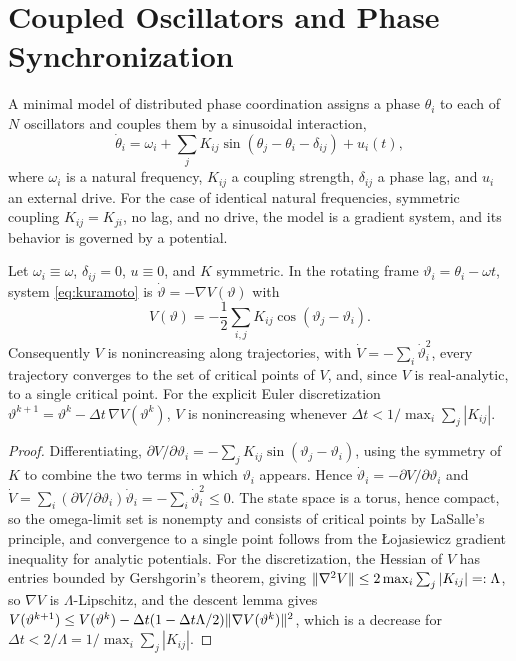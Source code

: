 \chapter{Coupled Oscillators and Phase Synchronization}\label{ch:kuramoto}

A minimal model of distributed phase coordination assigns a phase $\theta_i$ to each of $N$ oscillators and couples them by a sinusoidal interaction,
\begin{equation}\label{eq:kuramoto}
\dot\theta_i=\omega_i+\sum_jK_{ij}\sin(\theta_j-\theta_i-\delta_{ij})+u_i(t),
\end{equation}
where $\omega_i$ is a natural frequency, $K_{ij}$ a coupling strength, $\delta_{ij}$ a phase lag, and $u_i$ an external drive. For the case of identical natural frequencies, symmetric coupling $K_{ij}=K_{ji}$, no lag, and no drive, the model is a gradient system, and its behavior is governed by a potential.

\begin{theorem}\label{thm:kuramoto-grad}
Let $\omega_i\equiv\omega$, $\delta_{ij}=0$, $u\equiv0$, and $K$ symmetric. In the rotating frame $\vartheta_i=\theta_i-\omega t$, system \eqref{eq:kuramoto} is $\dot\vartheta=-\nabla V(\vartheta)$ with
\begin{equation}\label{eq:V}
V(\vartheta)=-\frac12\sum_{i,j}K_{ij}\cos(\vartheta_j-\vartheta_i).
\end{equation}
Consequently $V$ is nonincreasing along trajectories, with $\dot V=-\sum_i\dot\vartheta_i^2$, every trajectory converges to the set of critical points of $V$, and, since $V$ is real-analytic, to a single critical point. For the explicit Euler discretization $\vartheta^{k+1}=\vartheta^k-\Delta t\,\nabla V(\vartheta^k)$, $V$ is nonincreasing whenever $\Delta t<1/\max_i\sum_j|K_{ij}|$.
\end{theorem}

\begin{proof}
Differentiating, $\partial V/\partial\vartheta_i=-\sum_jK_{ij}\sin(\vartheta_j-\vartheta_i)$, using the symmetry of $K$ to combine the two terms in which $\vartheta_i$ appears. Hence $\dot\vartheta_i=-\partial V/\partial\vartheta_i$ and $\dot V=\sum_i(\partial V/\partial\vartheta_i)\dot\vartheta_i=-\sum_i\dot\vartheta_i^2\le0$. The state space is a torus, hence compact, so the omega-limit set is nonempty and consists of critical points by LaSalle's principle, and convergence to a single point follows from the \L ojasiewicz gradient inequality for analytic potentials. For the discretization, the Hessian of $V$ has entries bounded by Gershgorin's theorem, giving $\lVert \nabla^2V\rVert\le2\max_i\sum_j|K_{ij}|=:\Lambda$, so $\nabla V$ is $\Lambda$-Lipschitz, and the descent lemma gives $V(\vartheta^{k+1})\le V(\vartheta^k)-\Delta t(1-\Delta t\Lambda/2)\lVert \nabla V(\vartheta^k)\rVert^2$, which is a decrease for $\Delta t<2/\Lambda=1/\max_i\sum_j|K_{ij}|$.
\end{proof}

